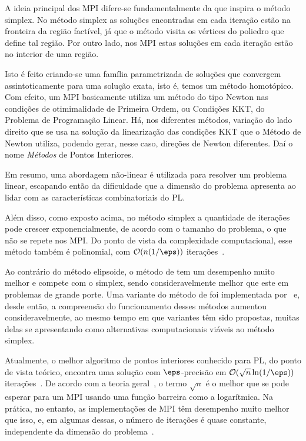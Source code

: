 A ideia principal dos \ac{MPI} difere-se fundamentalmente da que inspira o
método simplex. No método simplex as soluções encontradas em cada iteração estão
na fronteira da região factível, já que o método visita os vértices do poliedro
que define tal região. Por outro lado, nos \ac{MPI} estas soluções em cada
iteração estão no interior de uma região. 

Isto é feito criando-se uma família
parametrizada de soluções que convergem assintoticamente para uma solução exata,
isto é, temos  um método homotópico. Com efeito, um \ac{MPI} basicamente utiliza um método do tipo Newton nas condições de otimimalidade de Primeira Ordem, ou Condições KKT, do Problema de Programação Linear. Há, nos diferentes métodos, variação  do lado direito que se usa na solução da linearização das condições KKT que o Método de Newton utiliza, podendo gerar, nesse caso,  direções de Newton diferentes. Daí o nome \emph{Métodos} de Pontos Interiores. 

Em resumo,  uma abordagem não-linear é utilizada para resolver um problema
linear, escapando então da  dificuldade que a dimensão do problema apresenta ao
 lidar com as características combinatoriais  do \ac{PL}.


Além disso,  como exposto acima,  no método simplex a quantidade de
iterações pode crescer exponencialmente, de acordo com o tamanho do problema,  o que não se repete
nos \ac{MPI}. Do ponto de vista
da complexidade computacional, esse método também é polinomial,  com
$\mathcal{O}(n(1/\eps))$ iterações~\cite{Karmarkar:1984cp}.
 
  
Ao contrário do método elipsoide, o método de \citeauthor{Karmarkar:1984cp} tem um desempenho muito
melhor e compete com o simplex, sendo consideravelmente melhor  que este em
problemas de grande porte. Uma variante do método de \citeauthor{Karmarkar:1984cp} foi implementada
por~\textcite{Adler:1989fw} e, desde então, a compreensão do funcionamento desses
métodos aumentou consideravelmente, ao mesmo tempo em que variantes têm
sido propostas, muitas delas se apresentando como alternativas computacionais
viáveis ao método simplex.

Atualmente, o melhor algoritmo de pontos interiores conhecido para \ac{PL},  do ponto de vista teórico, 
encontra uma solução com $\eps$-precisão em $\Oset(\sqrt{n}\ln(1/\eps))$
iterações~\cite{Renegar:1988cr}.
De acordo com a teoria geral~\cite[Capítulo 4]{Nesterov:2003wi}, o termo
$\sqrt{n}$  é o melhor que se pode esperar para um \ac{MPI} usando uma função barreira como a
logarítmica. Na prática, no entanto, as implementações de \ac{MPI}  têm desempenho muito melhor que
isso, e, em algumas dessas, o número de iterações é quase constante, independente da dimensão do
problema~\cite{Colombo:2008ia}.


